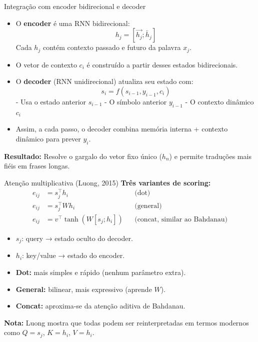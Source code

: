 \documentclass{beamer}
\begin{document}
\begin{frame}{Integração com encoder bidirecional e decoder}
\begin{itemize}
  \item O \textbf{encoder} é uma RNN bidirecional:
  \[
  h_j = [\overrightarrow{h_j}; \overleftarrow{h_j}]
  \]
  Cada $h_j$ contém contexto passado e futuro da palavra $x_j$.
  
  \item O vetor de contexto $c_i$ é construído a partir desses estados bidirecionais.
  
  \item O \textbf{decoder} (RNN unidirecional) atualiza seu estado com:
  \[
  s_i = f(s_{i-1}, y_{i-1}, c_i)
  \]
  - Usa o estado anterior $s_{i-1}$
  - O símbolo anterior $y_{i-1}$
  - O contexto dinâmico $c_i$
  
  \item Assim, a cada passo, o decoder combina memória interna + contexto dinâmico para prever $y_i$.
\end{itemize}

\textbf{Resultado:} 
Resolve o gargalo do vetor fixo único ($h_n$) e permite traduções mais fiéis em frases longas.
\end{frame}


\begin{frame}{Atenção multiplicativa (Luong, 2015)}
\textbf{Três variantes de scoring:}
\[
\begin{aligned}
e_{ij} &= s_j^\top h_i && \text{(dot)} \\
e_{ij} &= s_j^\top W h_i && \text{(general)} \\
e_{ij} &= v^\top \tanh(W [s_j; h_i]) && \text{(concat, similar ao Bahdanau)}
\end{aligned}
\]

\begin{itemize}
  \item $s_j$: query → estado oculto do decoder.
  \item $h_i$: key/value → estado do encoder.
  \item \textbf{Dot:} mais simples e rápido (nenhum parâmetro extra).
  \item \textbf{General:} bilinear, mais expressivo (aprende $W$).
  \item \textbf{Concat:} aproxima-se da atenção aditiva de Bahdanau.
\end{itemize}

\textbf{Nota:} Luong mostra que todas podem ser reinterpretadas em termos modernos como $Q=s_j$, $K=h_i$, $V=h_i$.
\end{frame}
\end{document}
